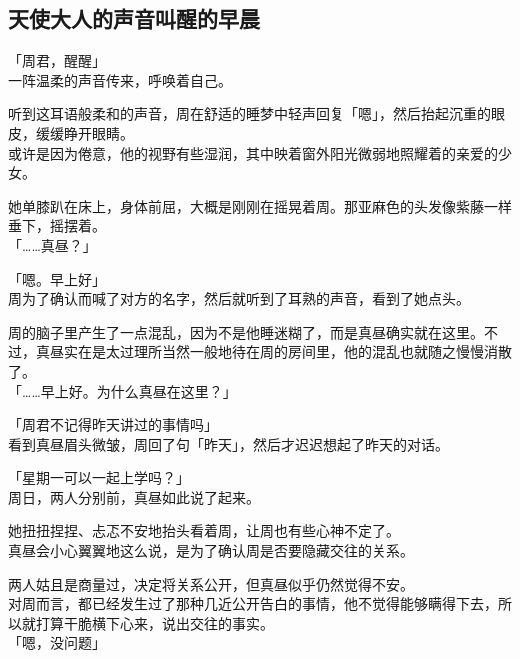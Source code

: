 \subsection{天使大人的声音叫醒的早晨}

「周君，醒醒」\\

一阵温柔的声音传来，呼唤着自己。

听到这耳语般柔和的声音，周在舒适的睡梦中轻声回复「嗯」，然后抬起沉重的眼皮，缓缓睁开眼睛。\\

或许是因为倦意，他的视野有些湿润，其中映着窗外阳光微弱地照耀着的亲爱的少女。

她单膝趴在床上，身体前屈，大概是刚刚在摇晃着周。那亚麻色的头发像紫藤一样垂下，摇摆着。\\

「……真昼？」

「嗯。早上好」\\

周为了确认而喊了对方的名字，然后就听到了耳熟的声音，看到了她点头。

周的脑子里产生了一点混乱，因为不是他睡迷糊了，而是真昼确实就在这里。不过，真昼实在是太过理所当然一般地待在周的房间里，他的混乱也就随之慢慢消散了。\\

「……早上好。为什么真昼在这里？」

「周君不记得昨天讲过的事情吗」\\

看到真昼眉头微皱，周回了句「昨天」，然后才迟迟想起了昨天的对话。\\

\vspace{2\baselineskip}

「星期一可以一起上学吗？」\\

周日，两人分别前，真昼如此说了起来。

她扭扭捏捏、忐忑不安地抬头看着周，让周也有些心神不定了。\\

真昼会小心翼翼地这么说，是为了确认周是否要隐藏交往的关系。

两人姑且是商量过，决定将关系公开，但真昼似乎仍然觉得不安。\\

对周而言，都已经发生过了那种几近公开告白的事情，他不觉得能够瞒得下去，所以就打算干脆横下心来，说出交往的事实。\\

「嗯，没问题」

